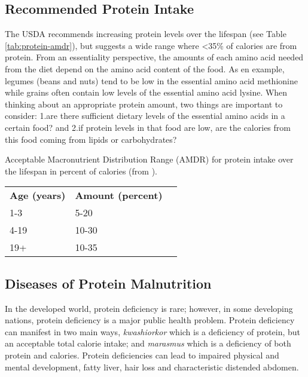 \documentclass{tufte-handout}
\begin{document}
\subsection{Recommended Protein Intake}

The USDA recommends increasing protein levels over the lifespan (see Table \ref{tab:protein-amdr}), but suggests a wide range where <35\% of calories are from protein.  From an essentiality perspective, the amounts of each amino acid needed from the diet depend on the amino acid content of the food.  As en example, legumes (beans and nuts) tend to be low in the essential amino acid methionine while grains often contain low levels of the essential amino acid lysine.  When thinking about an appropriate protein amount, two things are important to consider: 1.are there sufficient dietary levels of the essential amino acids in a certain  food? and 2.if protein levels in that food are low, are the calories from this food coming from lipids or carbohydrates?

\begin{margintable}
\centering
\caption{ Acceptable Macronutrient Distribution Range (AMDR) for protein intake over the lifespan in percent of calories (from \citep{USDA2015}).}
\label{tab:protein-amdr}
\begin{tabular}{lll}
\hline
\textbf {Age (years)} & \textbf{Amount (percent)}\\
1-3 & 5-20\\
4-19 & 10-30\\
19+ & 10-35\\
\hline

\hline
\end{tabular}
\end{margintable}

\subsection{Diseases of Protein Malnutrition}

In the developed world, protein deficiency is rare; however, in some developing nations, protein deficiency is a major public health problem.  Protein deficiency can manifest in two main ways, \emph{kwashiorkor} which is a deficiency of protein, but an acceptable total calorie intake; and \emph{marasmus} which is a deficiency of both protein and calories.  Protein deficiencies can lead to impaired physical and mental development, fatty liver, hair loss and characteristic distended abdomen.
\end{document}
